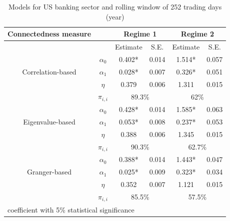 \documentclass{article}
\begin{document}
\begin{table}
  \caption{Models for US banking sector and rolling window of 252 trading days (year)}
  \begin{tabular}{cccccc}
    \toprule
     Connectedness measure &  & \multicolumn{2}{c}{\bfseries Regime 1} & \multicolumn{2}{c}{\bfseries Regime 2}  \\
     \hline
     & & Estimate & S.E. & Estimate & S.E. \\
     \hline
     \multirow{3}{*}[\normalbaselineskip]{Correlation-based} & $\alpha_0$ & 0.402* & 0.014 & 1.514*  & 0.057 \\
      & $\alpha_1$ & 0.028* & 0.007 & 0.326* & 0.051 \\
      & $\eta$ & 0.379 & 0.006 & 1.311 & 0.015 \\
      & $\pi_{i,i}$ &  \multicolumn{2}{c}{89.3\%} & \multicolumn{2}{c}{62\%}\\
      \hline
      \multirow{3}{*}[\normalbaselineskip]{Eigenvalue-based} & $\alpha_0$ & 0.428* & 0.014 & 1.585*  & 0.063 \\
      & $\alpha_1$ & 0.053* & 0.008 & 0.237* & 0.053 \\
      & $\eta$ & 0.388 & 0.006 & 1.345 & 0.015 \\
      & $\pi_{i,i}$ &  \multicolumn{2}{c}{90.3\%} & \multicolumn{2}{c}{62.7\%}\\
      \hline
      \multirow{3}{*}[\normalbaselineskip]{Granger-based} & $\alpha_0$ & 0.388* & 0.014 & 1.443*  & 0.047 \\
      & $\alpha_1$ & 0.025* & 0.009 & 0.323* & 0.034 \\
      & $\eta$ & 0.352 & 0.007 & 1.121 & 0.015 \\
      & $\pi_{i,i}$ &  \multicolumn{2}{c}{85.5\%} & \multicolumn{2}{c}{57.5\%}\\
      \hline
    \multicolumn{6}{l}{\footnotesize * coefficient with 5\% statistical significance} \\
    \hline
  \end{tabular}
\end{table}

\newpage


\end{document}
